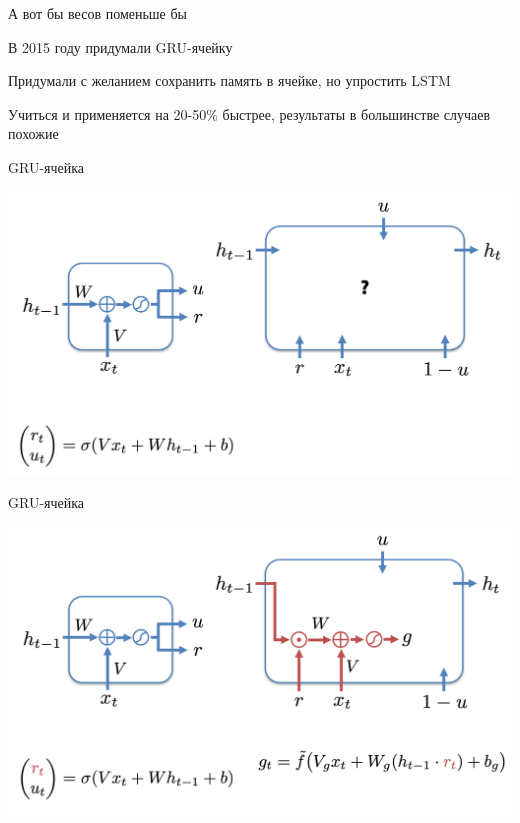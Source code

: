 \documentclass[notes,12pt, aspectratio=169]{beamer}
\newenvironment{wideitemize}{\itemize\addtolength{\itemsep}{10pt}}{\enditemize}
\begin{document}
\begin{frame}{А вот бы весов поменьше бы}
\begin{wideitemize}
	\item  В 2015 году придумали GRU-ячейку
	
	\item Придумали с желанием сохранить память в ячейке, но упростить LSTM
	
	\item Учиться и применяется на 20-50\% быстрее, результаты в большинстве случаев похожие
\end{wideitemize}
\end{frame}

\begin{frame}{GRU-ячейка}
\begin{center}
	\includegraphics[width=.8\linewidth]{gru1.png}
\end{center}
\end{frame}

\begin{frame}{GRU-ячейка}
\begin{center}
	\includegraphics[width=.8\linewidth]{gru2.png}
\end{center}
\end{frame}
\end{document}
